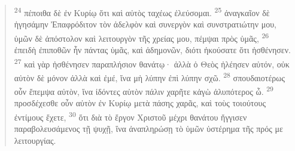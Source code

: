 \documentclass{article}
\begin{document}
\begin{verse}
\textsuperscript{24} πέποιθα δὲ ἐν Κυρίῳ ὅτι καὶ αὐτὸς ταχέως ἐλεύσομαι.
\textsuperscript{25} ἀναγκαῖον δὲ ἡγησάμην Ἐπαφρόδιτον τὸν ἀδελφὸν καὶ συνεργὸν καὶ συνστρατιώτην μου, ὑμῶν δὲ ἀπόστολον καὶ λειτουργὸν τῆς χρείας μου, πέμψαι πρὸς ὑμᾶς,
\textsuperscript{26} ἐπειδὴ ἐπιποθῶν ἦν πάντας ὑμᾶς, καὶ ἀδημονῶν, διότι ἠκούσατε ὅτι ἠσθένησεν.
\textsuperscript{27} καὶ γὰρ ἠσθένησεν παραπλήσιον θανάτῳ· ἀλλὰ ὁ Θεὸς ἠλέησεν αὐτόν, οὐκ αὐτὸν δὲ μόνον ἀλλὰ καὶ ἐμέ, ἵνα μὴ λύπην ἐπὶ λύπην σχῶ.
\textsuperscript{28} σπουδαιοτέρως οὖν ἔπεμψα αὐτὸν, ἵνα ἰδόντες αὐτὸν πάλιν χαρῆτε κἀγὼ ἀλυπότερος ὦ.
\textsuperscript{29} προσδέχεσθε οὖν αὐτὸν ἐν Κυρίῳ μετὰ πάσης χαρᾶς, καὶ τοὺς τοιούτους ἐντίμους ἔχετε,
\textsuperscript{30} ὅτι διὰ τὸ ἔργον Χριστοῦ μέχρι θανάτου ἤγγισεν παραβολευσάμενος τῇ ψυχῇ, ἵνα ἀναπληρώσῃ τὸ ὑμῶν ὑστέρημα τῆς πρός με λειτουργίας.
\end{verse}
\end{document}
